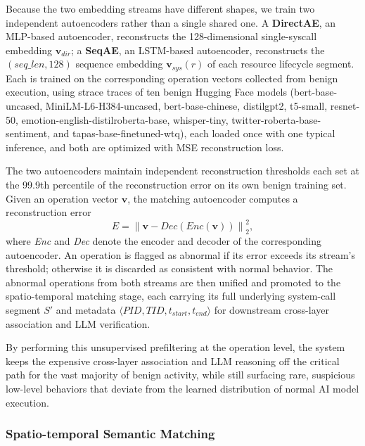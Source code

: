 Because the two embedding streams have different shapes, we train two independent autoencoders rather than a single shared one. A \textbf{DirectAE}, an MLP-based autoencoder, reconstructs the 128-dimensional single-syscall embedding $\mathbf{v}_{\textit{dir}}$; a \textbf{SeqAE}, an LSTM-based autoencoder, reconstructs the $(\textit{seq\_len}, 128)$ sequence embedding $\mathbf{v}_{\textit{sys}}(r)$ of each resource lifecycle segment. Each is trained on the corresponding operation vectors collected from benign execution, using strace traces of ten benign Hugging Face models (bert-base-uncased, MiniLM-L6-H384-uncased, bert-base-chinese, distilgpt2, t5-small, resnet-50, emotion-english-distilroberta-base, whisper-tiny, twitter-roberta-base-sentiment, and tapas-base-finetuned-wtq), each loaded once with one typical inference, and both are optimized with MSE reconstruction loss.

The two autoencoders maintain independent reconstruction thresholds each set at the 99.9th percentile of the reconstruction error on its own benign training set. Given an operation vector $\mathbf{v}$, the matching autoencoder computes a reconstruction error
\begin{equation}
E = \left\lVert \mathbf{v} - \textit{Dec}(\textit{Enc}(\mathbf{v})) \right\rVert_2^2,
\end{equation}
where \textit{Enc} and \textit{Dec} denote the encoder and decoder of the corresponding autoencoder. An operation is flagged as abnormal if its error exceeds its stream's threshold; otherwise it is discarded as consistent with normal behavior. The abnormal operations from both streams are then unified and promoted to the spatio-temporal matching stage, each carrying its full underlying system-call segment $S'$ and metadata $\langle \textit{PID}, \textit{TID}, t_{\textit{start}}, t_{\textit{end}} \rangle$ for downstream cross-layer association and LLM verification.

By performing this unsupervised prefiltering at the operation level, the system keeps the expensive cross-layer association and LLM reasoning off the critical path for the vast majority of benign activity, while still surfacing rare, suspicious low-level behaviors that deviate from the learned distribution of normal AI model execution.

\subsubsection{Spatio-temporal Semantic Matching}

